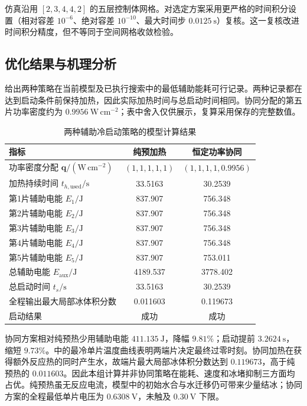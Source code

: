 \documentclass{gmcmthesis}
\begin{document}
仿真沿用 $[2,3,4,4,2]$ 的五层控制体网格。对选定方案采用更严格的时间积分设置（相对容差 $10^{-6}$、绝对容差 $10^{-10}$、最大时间步 $0.0125~\mathrm{s}$）复核。这一复核改进时间积分精度，但不等同于空间网格收敛检验。

\subsection{优化结果与机理分析}

给出两种策略在当前模型及已执行搜索中的最低辅助能耗可行记录。两种记录都在达到启动条件前保持加热，因此实际加热时间与总启动时间相同。协同分配的第五片功率密度约为 $0.9956~\mathrm{W\,cm^{-2}}$；表中舍入仅供展示，复算采用保存的完整数值。

\begin{table}[H]
  \centering
  \caption{两种辅助冷启动策略的模型计算结果}
  \label{tab:q3-results}
  \begin{tabular}{lcc}
    \toprule
    指标 & 纯预加热 & 恒定功率协同\\
    \midrule
    功率密度分配 $\bm q/(\mathrm{W\,cm^{-2}})$ & $(1,1,1,1,1)$ & $(1,1,1,1,0.9956)$\\
    加热持续时间 $t_{h,\mathrm{used}}/\mathrm{s}$ & 33.5163 & 30.2539\\
    第1片辅助电能 $E_1/\mathrm{J}$ & 837.907 & 756.348\\
    第2片辅助电能 $E_2/\mathrm{J}$ & 837.907 & 756.348\\
    第3片辅助电能 $E_3/\mathrm{J}$ & 837.907 & 756.348\\
    第4片辅助电能 $E_4/\mathrm{J}$ & 837.907 & 756.348\\
    第5片辅助电能 $E_5/\mathrm{J}$ & 837.907 & 753.011\\
    总辅助电能 $E_{\mathrm{aux}}/\mathrm{J}$ & 4189.537 & 3778.402\\
    总启动时间 $t_s/\mathrm{s}$ & 33.5163 & 30.2539\\
    全程输出最大局部冰体积分数 & 0.011603 & 0.119673\\
    启动结果 & 成功 & 成功\\
    \bottomrule
  \end{tabular}
\end{table}

协同方案相对纯预热少用辅助电能 $411.135~\mathrm{J}$，降幅 $9.81\%$；启动提前 $3.2624~\mathrm{s}$，缩短 $9.73\%$。中的最冷单片温度曲线表明两端片决定最终过零时刻。协同加热在获得额外反应热的同时产生水，故端片最大局部冰体积分数达到 $0.119673$，高于纯预热的 $0.011603$。因此本组计算并非协同策略在能耗、速度和冰堵抑制三方面均占优。纯预热虽无反应电流，模型中的初始水合与水迁移仍可带来少量结冰；协同方案的全程最低单片电压为 $0.6308~\mathrm{V}$，未触及 $0.30~\mathrm{V}$ 下限。
\end{document}
